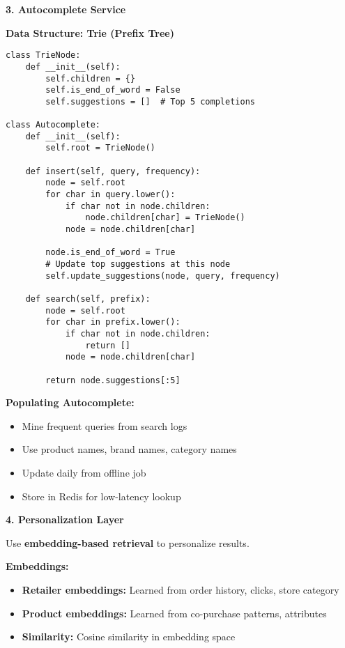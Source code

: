 \documentclass[11pt,letterpaper]{article}
\begin{document}
\textbf{3. Autocomplete Service}

\textbf{Data Structure: Trie (Prefix Tree)}

\begin{lstlisting}
class TrieNode:
    def __init__(self):
        self.children = {}
        self.is_end_of_word = False
        self.suggestions = []  # Top 5 completions

class Autocomplete:
    def __init__(self):
        self.root = TrieNode()

    def insert(self, query, frequency):
        node = self.root
        for char in query.lower():
            if char not in node.children:
                node.children[char] = TrieNode()
            node = node.children[char]

        node.is_end_of_word = True
        # Update top suggestions at this node
        self.update_suggestions(node, query, frequency)

    def search(self, prefix):
        node = self.root
        for char in prefix.lower():
            if char not in node.children:
                return []
            node = node.children[char]

        return node.suggestions[:5]
\end{lstlisting}

\textbf{Populating Autocomplete:}
\begin{itemize}
    \item Mine frequent queries from search logs
    \item Use product names, brand names, category names
    \item Update daily from offline job
    \item Store in Redis for low-latency lookup
\end{itemize}

\textbf{4. Personalization Layer}

Use \textbf{embedding-based retrieval} to personalize results.

\textbf{Embeddings:}
\begin{itemize}
    \item \textbf{Retailer embeddings:} Learned from order history, clicks, store category
    \item \textbf{Product embeddings:} Learned from co-purchase patterns, attributes
    \item \textbf{Similarity:} Cosine similarity in embedding space
\end{itemize}
\end{document}
